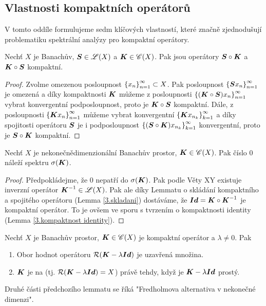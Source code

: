 \subsection{Vlastnosti kompaktních operátorů}
V tomto oddíle formulujeme sedm klíčových vlastností, které značně zjednodušují problematiku spektrální analýzy pro kompaktní operátory.

\begin{lemma} \label{3.skladani}
Nechť $X$ je Banachův, $\boldsymbol{S} \in \mathscr{L} (X)$ a $\boldsymbol{K} \in \mathscr{C}(X)$. Pak jsou operátory $ \boldsymbol{S} \circ \boldsymbol{K}$ a $\boldsymbol{K} \circ \boldsymbol{S}$ kompaktní.
\end{lemma}

\begin{proof}
Zvolme omezenou posloupnost $\left \lbrace x_n \right \rbrace_{n=1}^\infty \subset X$. Pak posloupnost $\left \lbrace \boldsymbol{S} x_n \right \rbrace_{n=1}^\infty$ je omezená a díky kompaktnosti $\boldsymbol{K}$ můžeme z posloupnosti $\left \lbrace (\boldsymbol{K} \circ \boldsymbol{S}) x_n \right \rbrace_{n=1}^\infty$ vybrat konvergentní podposloupnost, proto je $\boldsymbol{K} \circ \boldsymbol{S}$ kompaktní. Dále, z  posloupnosti $\left \lbrace \boldsymbol{K} x_n \right \rbrace_{n=1}^\infty$ můžeme vybrat konvergentní $\left \lbrace \boldsymbol{K} x_{n_k} \right \rbrace_{k=1}^\infty$ a díky spojitosti operátoru $\boldsymbol{S}$ je i podposloupnost $\left \lbrace (\boldsymbol{S} \circ \boldsymbol{K}) x_{n_k} \right \rbrace_{k=1}^\infty$ konvergentní, proto je $\boldsymbol{S} \circ \boldsymbol{K}$ kompaktní.

\end{proof}

\begin{lemma}
Nechť $X$ je nekonečnědimenzionální Banachův prostor, $\boldsymbol{K} \in \mathscr{C}(X)$. Pak číslo $0$ náleží spektru $\sigma(\boldsymbol{K})$.
\end{lemma}

\begin{proof}
Předpokládejme, že $0$ nepatří do $\sigma(\boldsymbol{K})$. Pak podle Věty XY existuje inverzní operátor $ \boldsymbol{K}^{-1} \in \mathscr{L}(X)$. Pak ale díky Lemmatu o skládání kompaktního a spojitého operátoru (Lemma \ref{3.skladani}) dostáváme, že $\boldsymbol{Id} = \boldsymbol{K} \circ \boldsymbol{K}^{-1}$ je kompaktní operátor. To je ovšem ve sporu s tvrzením o kompaktnosti identity (Lemma \ref{3.kompaktnost identity}).
\end{proof}

\begin{lemma}
Nechť $X$ je Banachův prostor, $\boldsymbol{K} \in \mathscr{C}(X)$ je kompaktní operátor a $\lambda \neq 0$. Pak \begin{enumerate}
    \item Obor hodnot operátoru $\mathcal{R}(\boldsymbol{K} - \lambda \boldsymbol{Id})$ je uzavřená množina.
    \item $\boldsymbol{K}$ je na (tj. $\mathcal{R}(\boldsymbol{K} - \lambda \boldsymbol{Id} )=X$) právě tehdy, když je $\boldsymbol{K} - \lambda \boldsymbol{Id}$ prostý.
\end{enumerate}
\end{lemma}
\begin{remark}
Druhé části předchozího lemmatu se říká "Fredholmova alternativa v nekonečné dimenzi".
\end{remark}

